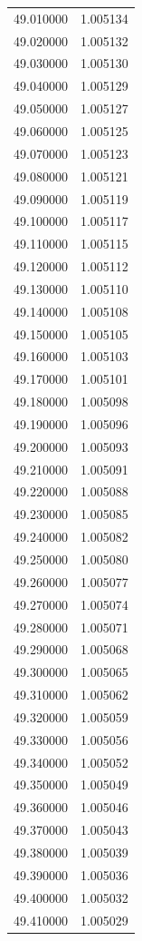 \begin{tabular}{rr}
49.010000 & 1.005134 \\
49.020000 & 1.005132 \\
49.030000 & 1.005130 \\
49.040000 & 1.005129 \\
49.050000 & 1.005127 \\
49.060000 & 1.005125 \\
49.070000 & 1.005123 \\
49.080000 & 1.005121 \\
49.090000 & 1.005119 \\
49.100000 & 1.005117 \\
49.110000 & 1.005115 \\
49.120000 & 1.005112 \\
49.130000 & 1.005110 \\
49.140000 & 1.005108 \\
49.150000 & 1.005105 \\
49.160000 & 1.005103 \\
49.170000 & 1.005101 \\
49.180000 & 1.005098 \\
49.190000 & 1.005096 \\
49.200000 & 1.005093 \\
49.210000 & 1.005091 \\
49.220000 & 1.005088 \\
49.230000 & 1.005085 \\
49.240000 & 1.005082 \\
49.250000 & 1.005080 \\
49.260000 & 1.005077 \\
49.270000 & 1.005074 \\
49.280000 & 1.005071 \\
49.290000 & 1.005068 \\
49.300000 & 1.005065 \\
49.310000 & 1.005062 \\
49.320000 & 1.005059 \\
49.330000 & 1.005056 \\
49.340000 & 1.005052 \\
49.350000 & 1.005049 \\
49.360000 & 1.005046 \\
49.370000 & 1.005043 \\
49.380000 & 1.005039 \\
49.390000 & 1.005036 \\
49.400000 & 1.005032 \\
49.410000 & 1.005029 \\

\end{tabular}
